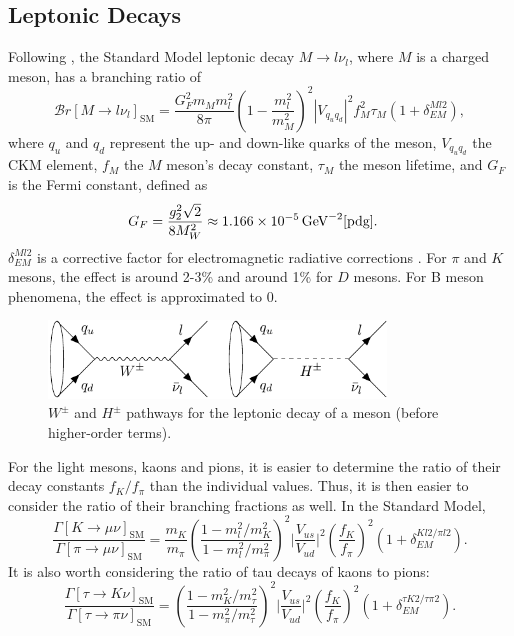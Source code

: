 \documentclass[a4paper,12pt]{article}
\begin{document}
\subsection{Leptonic Decays}
\label{subsec:lep}
Following \cite{desc}, the Standard Model leptonic decay $M\to l\nu_l$, where $M$ is a charged meson, has a branching ratio of
\begin{equation}
    \label{eq:mlv}
    \mathcal{B}r[M\to l\nu_l]_{\text{SM}} = \frac{G_F^2m_Mm_l^2}{8\pi}\left(1-\frac{m_l^2}{m_M^2}\right)^2 |V_{q_uq_d}|^2f_M^2\tau_M(1+\delta_{EM}^{Ml2}),
\end{equation}
where $q_u$ and $q_d$ represent the up- and down-like quarks of the meson, $V_{q_uq_d}$ the CKM element, $f_M$ the $M$ meson's decay constant, $\tau_M$ the meson lifetime, and $G_F$ is the Fermi constant, defined as
\begin{align}
    G_F &= \frac{g_2^2\sqrt{2}}{8M_W^2} \approx 1.166\times10^{-5}\,\text{GeV}^{-2} \cite{pdg}.
\end{align}
$\delta_{EM}^{Ml2}$ is a corrective factor for electromagnetic radiative corrections \cite{pdg}. 
For $\pi$ and $K$ mesons, the effect is around 2-3\% and around 1\% for $D$ mesons.
For B meson phenomena, the effect is approximated to 0. 
\begin{figure}[ht]
    \centering
    \includegraphics[width=0.8\textwidth]{mesons.pdf}
    \caption{\label{fig:mesons}$W^\pm$ and $H^\pm$ pathways for the leptonic decay of a meson (before higher-order terms).}
\end{figure}
For the light mesons, kaons and pions, it is easier to determine the ratio of their decay constants $f_K/f_\pi$ than the individual values.
Thus, it is then easier to consider the ratio of their branching fractions as well. 
In the Standard Model, 
\begin{equation}
    \label{eq:kpi}
    \frac{\Gamma[K\to\mu\nu]_{\text{SM}}}{\Gamma[\pi\to\mu\nu]_{\text{SM}}} = \frac{m_K}{m_\pi}\left(\frac{1-m_l^2/m_K^2}{1-m_l^2/m_\pi^2}\right)^2 \bigg|\frac{V_{us}}{V_{ud}}\bigg|^2\left(\frac{f_K}{f_\pi}\right)^2(1+\delta^{Kl2/\pi l2}_{EM}).
\end{equation}
It is also worth considering the ratio of tau decays of kaons to pions:
\begin{equation}
    \label{ep:tkpi}
    \frac{\Gamma[\tau\to K\nu]_{\text{SM}}}{\Gamma[\tau\to\pi\nu]_{\text{SM}}} = \left(\frac{1-m_K^2/m_\tau^2}{1-m_\pi^2/m_\tau^2}\right)^2\bigg|\frac{V_{us}}{V_{ud}}\bigg|^2\left(\frac{f_K}{f_\pi}\right)^2(1+\delta_{EM}^{\tau K2/\tau\pi2}).
\end{equation}
\end{document}
